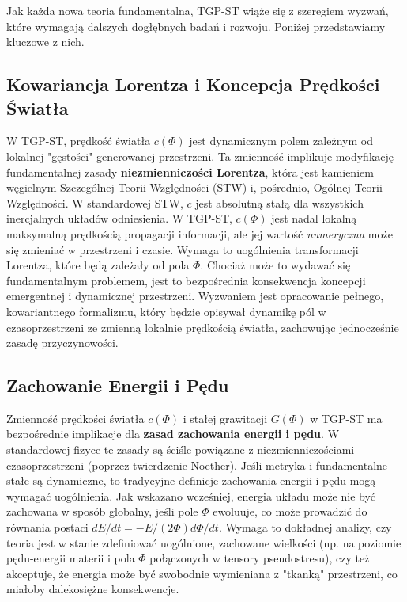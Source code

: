\documentclass[11pt,a4paper]{article}
\begin{document}
Jak każda nowa teoria fundamentalna, TGP-ST wiąże się z szeregiem wyzwań, które wymagają dalszych dogłębnych badań i rozwoju. Poniżej przedstawiamy kluczowe z nich.

\subsection{Kowariancja Lorentza i Koncepcja Prędkości Światła}
W TGP-ST, prędkość światła $c(\Phi)$ jest dynamicznym polem zależnym od lokalnej "gęstości" generowanej przestrzeni. Ta zmienność implikuje modyfikację fundamentalnej zasady \textbf{niezmienniczości Lorentza}, która jest kamieniem węgielnym Szczególnej Teorii Względności (STW) i, pośrednio, Ogólnej Teorii Względności.
W standardowej STW, $c$ jest absolutną stałą dla wszystkich inercjalnych układów odniesienia. W TGP-ST, $c(\Phi)$ jest nadal lokalną maksymalną prędkością propagacji informacji, ale jej wartość \textit{numeryczna} może się zmieniać w przestrzeni i czasie. Wymaga to uogólnienia transformacji Lorentza, które będą zależały od pola $\Phi$. Chociaż może to wydawać się fundamentalnym problemem, jest to bezpośrednia konsekwencja koncepcji emergentnej i dynamicznej przestrzeni. Wyzwaniem jest opracowanie pełnego, kowariantnego formalizmu, który będzie opisywał dynamikę pól w czasoprzestrzeni ze zmienną lokalnie prędkością światła, zachowując jednocześnie zasadę przyczynowości.

\subsection{Zachowanie Energii i Pędu}
Zmienność prędkości światła $c(\Phi)$ i stałej grawitacji $G(\Phi)$ w TGP-ST ma bezpośrednie implikacje dla \textbf{zasad zachowania energii i pędu}. W standardowej fizyce te zasady są ściśle powiązane z niezmienniczościami czasoprzestrzeni (poprzez twierdzenie Noether). Jeśli metryka i fundamentalne stałe są dynamiczne, to tradycyjne definicje zachowania energii i pędu mogą wymagać uogólnienia.
Jak wskazano wcześniej, energia układu może nie być zachowana w sposób globalny, jeśli pole $\Phi$ ewoluuje, co może prowadzić do równania postaci $dE/dt = -E/(2\Phi) d\Phi/dt$. Wymaga to dokładnej analizy, czy teoria jest w stanie zdefiniować uogólnione, zachowane wielkości (np. na poziomie pędu-energii materii i pola $\Phi$ połączonych w tensory pseudostresu), czy też akceptuje, że energia może być swobodnie wymieniana z "tkanką" przestrzeni, co miałoby dalekosiężne konsekwencje.
\end{document}
